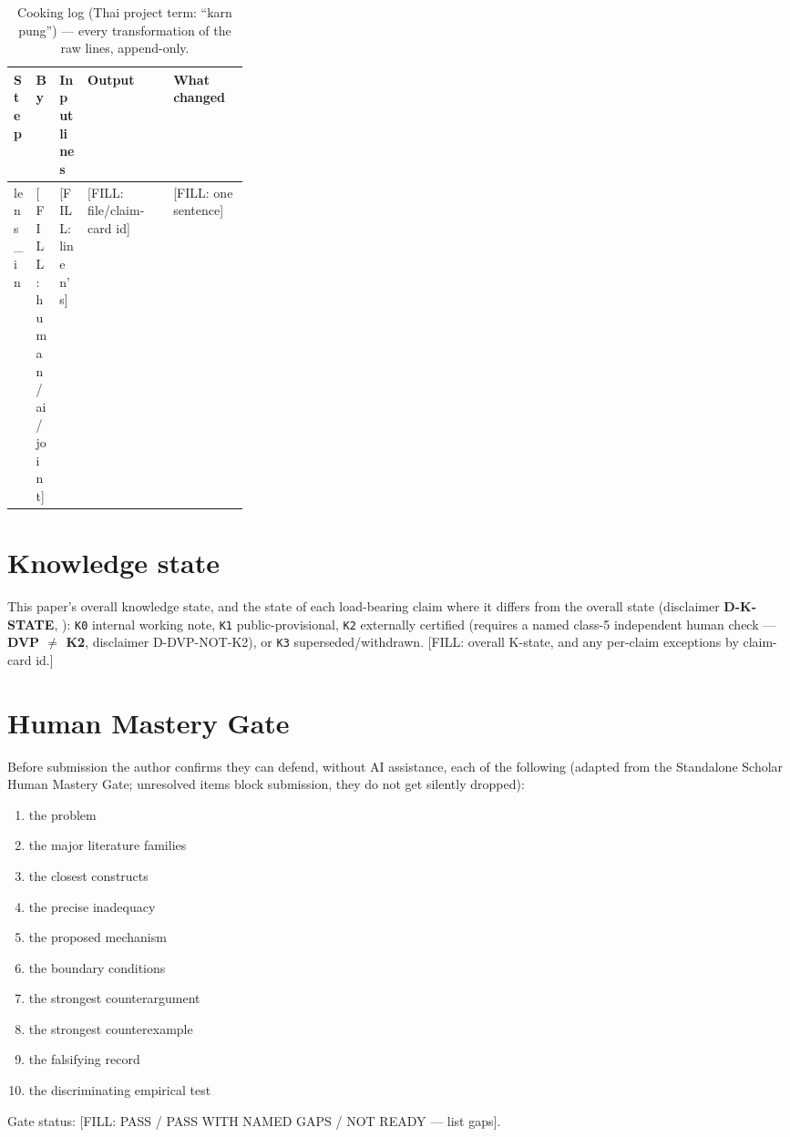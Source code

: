 \documentclass[10pt,twocolumn]{article}
\begin{document}
\begin{table}[t]
\centering
\scriptsize
\begin{tabularx}{\linewidth}{@{}p{0.09\linewidth} p{0.09\linewidth} p{0.12\linewidth} X X@{}}
\toprule
\textbf{Step} & \textbf{By} & \textbf{Input lines} & \textbf{Output} & \textbf{What changed} \\
\midrule
lens\_in & [FILL: human / ai / joint] & [FILL: line n's] & [FILL: file/claim-card id] & [FILL: one sentence] \\
\bottomrule
\end{tabularx}
\caption{Cooking log (Thai project term: ``karn pung'') --- every transformation of the raw lines, append-only.}
\label{tab:cooking-log}
\end{table}

\section{Knowledge state}
\label{sec:kstate}
This paper's overall knowledge state, and the state of each load-bearing
claim where it differs from the overall state (disclaimer
\textbf{D-K-STATE}, ):
\texttt{K0} internal working note, \texttt{K1} public-provisional,
\texttt{K2} externally certified (requires a named class-5 independent human
check --- \textbf{DVP $\neq$ K2}, disclaimer D-DVP-NOT-K2), or \texttt{K3}
superseded/withdrawn. [FILL: overall K-state, and any per-claim exceptions
by claim-card id.]

\section{Human Mastery Gate}
\label{sec:mastery-gate}
Before submission the author confirms they can defend, without AI assistance,
each of the following (adapted from the Standalone Scholar Human Mastery
Gate; unresolved items block submission, they do not get silently dropped):
\begin{enumerate}[itemsep=0.1em]
  \item the problem \item the major literature families \item the closest
  constructs \item the precise inadequacy \item the proposed mechanism
  \item the boundary conditions \item the strongest counterargument
  \item the strongest counterexample \item the falsifying record
  \item the discriminating empirical test
\end{enumerate}
Gate status: [FILL: PASS / PASS WITH NAMED GAPS / NOT READY --- list gaps].
\end{document}
